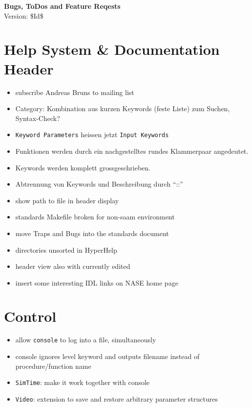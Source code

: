 \documentclass[12pt]{article}
\begin{document}
\begin{center}
{\Huge\textbf{Bugs, ToDos and Feature Reqests}}\\[2cm]
Version: \$Id$ $\$ 
\end{center}

\section{Help System \& Documentation Header} 

\begin{itemize}
\item subscribe Andreas Bruns to mailing list
\item Category: Kombination aus kurzen Keywords (feste Liste) zum Suchen, Syntax-Check?
\item \texttt{Keyword Parameters} heissen jetzt \texttt{Input Keywords}
\item Funktionen werden durch ein nachgestelltes rundes Klammerpaar angedeutet.
\item Keywords werden komplett grossgeschrieben. 
\item Abtrennung von Keywords und Beschreibung durch ``::''
\item show path to file in header display
\item standards Makefile broken for non-saam environment
\item move Traps and Bugs into the standards document
\item directories unsorted in HyperHelp
\item header view also with currently edited 
\item insert some interesting IDL links on NASE home page
\end{itemize}



\section{Control}
\begin{itemize}
\item allow \texttt{console} to log into a file, simultaneously
\item console ignores level keyword and outputs filename instead of procedure/function name
\item \texttt{SimTime}: make it work together with console
\item \texttt{Video}: extension to save and restore arbitrary parameter structures
\end{itemize}
\end{document}
